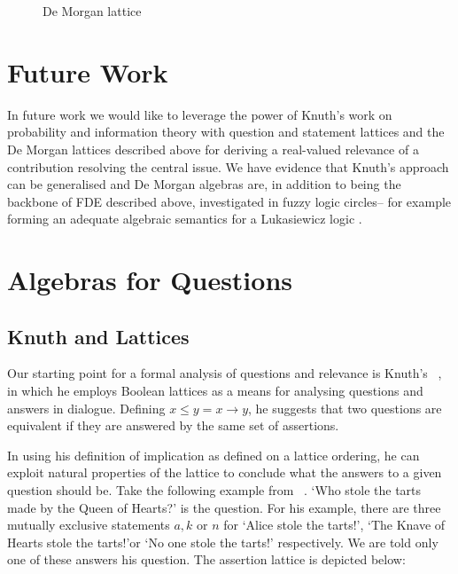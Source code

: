 \documentclass[11pt,a4paper]{article}
\theoremstyle{definition}
\begin{document}
\begin{figure}[!t]
\begin{center}

\end{center}
\vspace*{-0.35cm}
\caption{De Morgan lattice}\label{fig:lattices}
\end{figure}

\section{Future Work}
In future work we would like to leverage the power of Knuth's work on probability and information theory with question and statement lattices and the De Morgan lattices described above for deriving a real-valued relevance of a contribution resolving the central issue. We have evidence that Knuth's approach can be generalised and De Morgan algebras are, in addition to being the backbone of FDE described above, investigated in fuzzy logic circles-- for example forming an adequate algebraic semantics for a Lukasiewicz logic \cite{Nguyen:1996:FCF:235242}. 



\iffalse
\section{Algebras for Questions}
\subsection{Knuth and Lattices}
Our starting point for a formal analysis of questions and relevance is Knuth's ~\cite{knuth2005lattice}, in which he employs Boolean lattices as a means for analysing questions and answers in dialogue. Defining $x \le y = x \rightarrow y$, he suggests that two questions are equivalent if they are answered by the
same set of assertions. \par In using his definition of implication as defined on a lattice ordering, he can exploit natural properties of the lattice to conclude what the answers to a given question should be. Take the following example from ~\cite{knuth2005lattice}. `Who stole the tarts made by the Queen of Hearts?' is the question. For his example, there are three mutually exclusive statements $a, k$ or $n$ for `Alice stole the tarts!', `The Knave of Hearts stole the tarts!'or `No one stole the tarts!' respectively. We are told only one of these answers his question. The assertion lattice is depicted below:
\end{document}
